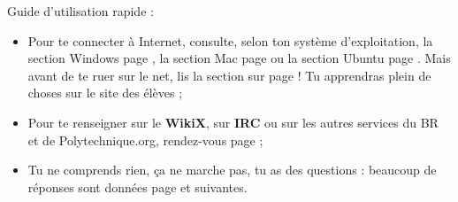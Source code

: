 Guide d'utilisation rapide :
\begin{itemize}
\item Pour te connecter à Internet, consulte, selon ton système d'exploitation, la section Windows page \pageref{windows}, la section Mac page \pageref{mac} ou la section Ubuntu page \pageref{ubuntu}. Mais avant de te ruer sur le net, lis la section sur \fkz page \pageref{services} ! Tu apprendras plein de choses sur le site des élèves ;
\item Pour te renseigner sur le \textbf{WikiX}, sur \textbf{IRC} ou sur les autres services du BR et de Polytechnique.org, rendez-vous page \pageref{services} ;
\item Tu ne comprends rien, ça ne marche pas, tu as des questions : beaucoup de réponses sont données page \pageref{faq} et suivantes.

\end{itemize}
